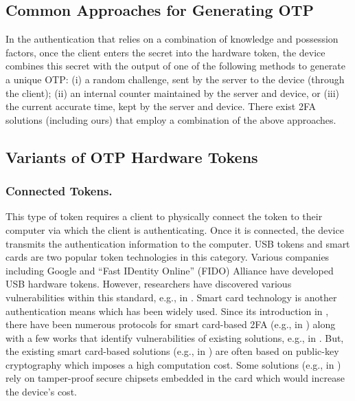 \vspace{-3mm}
\subsection{Common Approaches for Generating OTP}
\vspace{-2mm}

In the authentication that relies on a combination of knowledge and possession factors, once the client enters the secret into the hardware token, the device combines this secret with the output of one of the following methods to generate a unique OTP:  (i) a random challenge, sent by the server to the device (through the client);  (ii) an internal counter maintained by the server and device, or (iii) the current accurate time, kept by the server and device. There exist 2FA solutions (including ours) that employ a combination of the above approaches. 

\vspace{-3mm}
\subsection{Variants of OTP Hardware Tokens}

\vspace{-2mm}
\subsubsection{Connected Tokens.}
This type of token requires a client to physically connect the token to their computer via which the client is authenticating. Once it is connected, the device transmits the authentication information to the computer. USB tokens and smart cards are two popular token technologies in this category.  Various companies including Google and  ``Fast IDentity Online'' (FIDO) Alliance have developed USB hardware tokens. However, researchers have discovered various vulnerabilities within this standard, e.g., in \cite{PanosMNPX17,ChangMSS17,LoutfiJ15,ndss/FengLP021}.  
%
Smart card technology is another authentication means which has been widely used. Since its introduction in \cite{chang1991remote}, there have been numerous protocols for smart card-based 2FA (e.g., in \cite{gupta2021machine,WangW18,radhakrishnan2022dependable}) along with a few works that identify vulnerabilities of existing solutions, e.g., in \cite{TianLHL20,WangGCW16,ChaturvediDMM16}. But, the existing smart card-based solutions (e.g., in \cite{gupta2021machine,WangW18,radhakrishnan2022dependable}) are often based on public-key cryptography which imposes a high computation cost. Some solutions (e.g., in \cite{kim2009more}) rely on tamper-proof secure chipsets embedded in the card which would increase the device's cost. 


